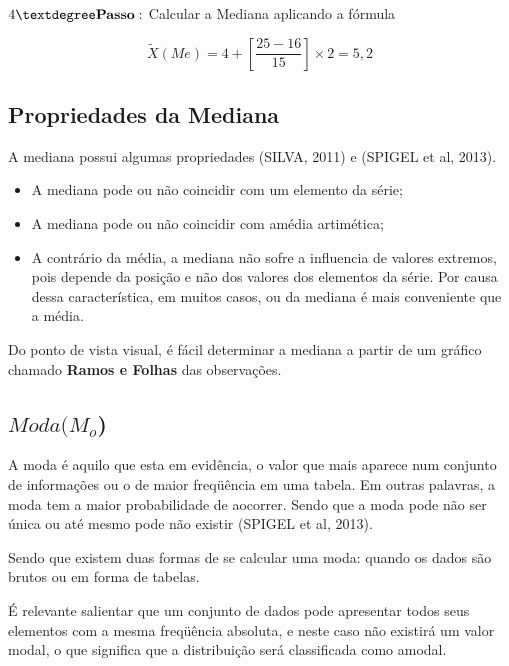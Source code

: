 $4° \mbox{\textbf{Passo}}:$ Calcular a Mediana aplicando a fórmula


\begin{equation}\label{}
    \tilde{X}(Me)= 4+\left[\frac{25-16}{15}\right]\times 2 = 5,2
\end{equation}








\subsection{Propriedades da Mediana}

A mediana possui algumas propriedades (SILVA, 2011) e (SPIGEL et al, 2013).

\begin{itemize}
\item A mediana pode ou não coincidir com um elemento da série;
\item A mediana pode ou não coincidir com amédia artimética;
\item A contrário da média, a mediana não sofre a influencia de valores extremos, pois depende da posição e não dos valores dos elementos da série. Por causa dessa característica, em muitos casos, ou da mediana é mais conveniente que a média.    
\end{itemize}


Do ponto de vista visual, é fácil determinar a mediana a partir de um gráfico chamado \textbf{Ramos e Folhas} das observações.




\subsection{$Moda (M_{o}$)}

A moda é aquilo que esta em evidência, o valor que mais aparece num conjunto de informações ou o de maior freqüência em uma tabela. Em outras palavras, a moda tem a maior probabilidade de aocorrer. Sendo que a moda pode não ser única ou até mesmo pode não existir (SPIGEL et al, 2013).\vskip0.3cm


Sendo que existem duas formas de se calcular uma moda: quando os dados são brutos ou em forma de tabelas.\vskip0.3cm

É relevante salientar que um conjunto de dados pode apresentar todos seus elementos com a mesma freqüência absoluta, e neste caso não existirá um valor modal, o que significa que a distribuição será classificada como amodal.\vskip0.3cm

